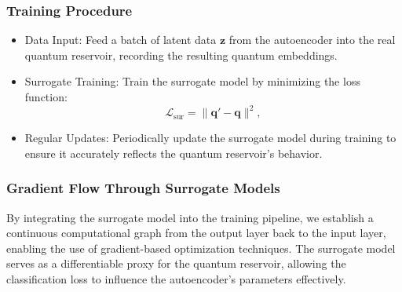 \documentclass[conference]{IEEEtran}
\begin{document}

\subsubsection{Training Procedure}
\begin{itemize}
    \item Data Input: 
    Feed a batch of latent data \( \bm{z} \) from the autoencoder 
    into the real quantum reservoir, recording the resulting quantum 
    embeddings.

    \item Surrogate Training:
    Train the surrogate model  by minimizing the loss function:
    \begin{equation}
        \mathcal{L}_{\text{sur}} = \| \bm{q}' - \bm{q} \|^2,
    \end{equation}

    
    \item Regular Updates:
    Periodically update the surrogate model during training
    to ensure it accurately reflects the quantum reservoir's
    behavior. 
\end{itemize}

\subsubsection{Gradient Flow Through Surrogate Models}
By integrating the surrogate model into the training pipeline, we establish a continuous computational graph from the output layer back to the input layer, enabling the use of gradient-based optimization techniques. The surrogate model serves as a differentiable proxy for the quantum reservoir, allowing the classification loss to influence the autoencoder's parameters effectively.

\end{document}
